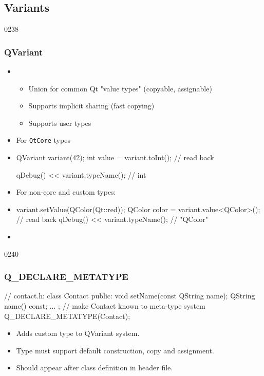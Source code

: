 %
%
%
%

\subsection{Variants}

\begin{slide}[fragile]{0238}\frametitle{QVariant}
\begin{itemize}
  \item {} 
  \begin{itemize}
    \item Union for common Qt "value types" (copyable, assignable)
    \item Supports implicit sharing (fast copying)
    \item Supports user types
  \end{itemize}
  \item For \texttt{QtCore} types  
  \item[] \begin{cpp}
QVariant variant(42);
int value = variant.toInt(); // read back

qDebug() << variant.typeName(); // int
\end{cpp}
\item For non-core and custom types:
  \item[] \begin{cpp}
variant.setValue(QColor(Qt::red));
QColor color = variant.value<QColor>(); // read back
qDebug() << variant.typeName(); // "QColor"
\end{cpp}
\item {}
\end{itemize}
\end{slide}

\begin{slide}[fragile]{0240}
\frametitle{Q\_DECLARE\_METATYPE}
\begin{cpp}
// contact.h:
class Contact {
public:
  void setName(const QString name);
  QString name() const;
  ...
};
// make Contact known to meta-type system
Q_DECLARE_METATYPE(Contact);
\end{cpp} 
\begin{itemize}
\item Adds custom type to QVariant system.
\item Type must support default construction, copy and assignment.
\item Should appear after class definition in header file.
\end{itemize}
\end{slide}


